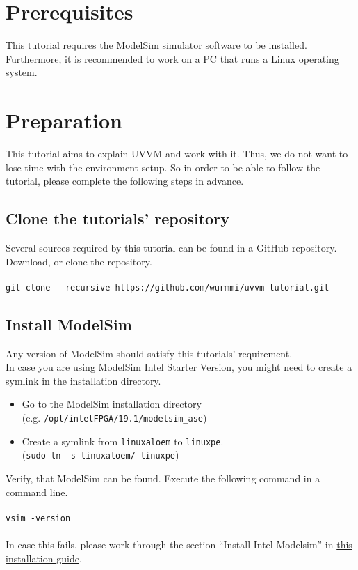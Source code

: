 \section{Prerequisites}

This tutorial requires the ModelSim simulator software to be installed.
Furthermore, it is recommended to work on a PC that runs a Linux operating system.

\section{Preparation}

This tutorial aims to explain UVVM and work with it.
Thus, we do not want to lose time with the environment setup.
So in order to be able to follow the tutorial, please complete the
following steps in advance.

\subsection{Clone the tutorials' repository}

Several sources required by this tutorial can be found in a GitHub repository.\\
Download, or clone the repository.\\
\\
\texttt{git clone -{}-recursive https://github.com/wurmmi/uvvm-tutorial.git }

\subsection{Install ModelSim}

Any version of ModelSim should satisfy this tutorials' requirement.\\

In case you are using ModelSim Intel Starter Version, you might need to
create a symlink in the installation directory.
\begin{itemize}
      \item Go to the ModelSim installation directory\\
            (e.g. \texttt{/opt/intelFPGA/19.1/modelsim\_ase})
      \item Create a symlink from \texttt{linuxaloem} to \texttt{linuxpe}.\\
            (\texttt{sudo ln -s linuxaloem/ linuxpe})
\end{itemize}

Verify, that ModelSim can be found. Execute the following command in a command line.\\
\\
\texttt{vsim -version}\\
\\
In case this fails, please work through the section ``Install Intel Modelsim''
in \href{../install-modelsim-on-ubuntu.pdf}{this installation guide}.

